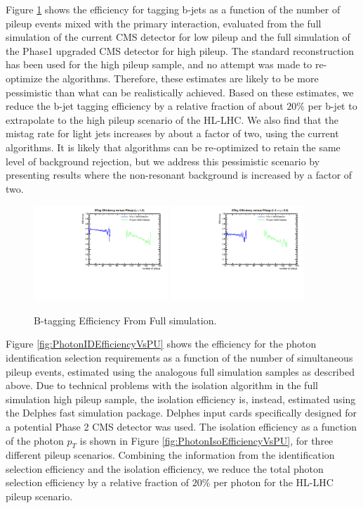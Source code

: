 \documentclass{cmspaper}
\begin{document}
Figure \ref{fig:BTaggingEfficiencyVsPU} shows the efficiency for tagging b-jets
as a function of the number of pileup events mixed with the primary interaction,
evaluated from the full simulation of the current CMS detector for low pileup and
the full simulation of the Phase1 upgraded CMS detector for high pileup. The standard
reconstruction has been used for the high pileup sample, and no attempt was made to
re-optimize the algorithms. Therefore, these estimates are likely to be 
more pessimistic than what can be realistically achieved. Based on these estimates, 
we reduce the b-jet tagging efficiency by a relative fraction of about $20\%$ per
b-jet to extrapolate to the high pileup scenario of the HL-LHC. We also find that
the mistag rate for light jets increases by about a factor of two, using the
current algorithms. It is likely that algorithms can be re-optimized to retain the
same level of background rejection, but we address this pessimistic scenario
by presenting results where the non-resonant background is increased by a factor
of two.

\begin{figure}[h]
  \centering
  \includegraphics[width=0.45\textwidth]{figures/BTagEfficiencyPU_CSVmedium_Eta1.pdf}
  \includegraphics[width=0.45\textwidth]{figures/BTagEfficiencyPU_CSVmedium_Eta2.pdf}
  \caption{B-tagging Efficiency From Full simulation.}
  \label{fig:BTaggingEfficiencyVsPU}
\end{figure} 

Figure \ref{fig:PhotonIDEfficiencyVsPU} shows the efficiency for the photon identification
selection requirements as a function of the number of simultaneous pileup events, estimated
using the analogous full simulation samples as described above. Due to technical
problems with the isolation algorithm in the full simulation high pileup sample, 
the isolation efficiency is, instead, estimated using the Delphes fast simulation package.
Delphes input cards specifically designed for a potential Phase 2 CMS detector was used.
The isolation efficiency as a function of the photon $p_{T}$ is shown in 
Figure \ref{fig:PhotonIsoEfficiencyVsPU}, for three different pileup scenarios. Combining
the information from the identification selection efficiency and the isolation efficiency,
we reduce the total photon selection efficiency by a relative fraction of $20\%$ per photon
for the HL-LHC pileup scenario.
\end{document}

